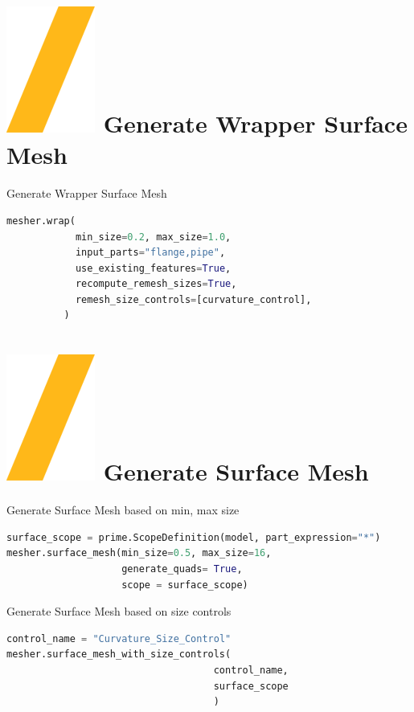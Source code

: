 \documentclass[9pt,landscape]{article}
\begin{document}
\begin{multicols}{3}
\section{\includegraphics[height=\fontcharht\font`\S]{slash.png} Generate Wrapper Surface Mesh}
Generate Wrapper Surface Mesh
\begin{lstlisting}[language=Python]
mesher.wrap(
            min_size=0.2, max_size=1.0,
            input_parts="flange,pipe",
            use_existing_features=True,
            recompute_remesh_sizes=True,
            remesh_size_controls=[curvature_control],
          )
\end{lstlisting}

\section{\includegraphics[height=\fontcharht\font`\S]{slash.png} Generate Surface Mesh}
Generate Surface Mesh based on min, max size  
\begin{lstlisting}[language=Python]
surface_scope = prime.ScopeDefinition(model, part_expression="*")
mesher.surface_mesh(min_size=0.5, max_size=16, 
                    generate_quads= True,
                    scope = surface_scope)
\end{lstlisting}

Generate Surface Mesh based on size controls  
\begin{lstlisting}[language=Python]
control_name = "Curvature_Size_Control"
mesher.surface_mesh_with_size_controls(
                                    control_name, 
                                    surface_scope
                                    )
\end{lstlisting}


\end{multicols}
\end{document}
